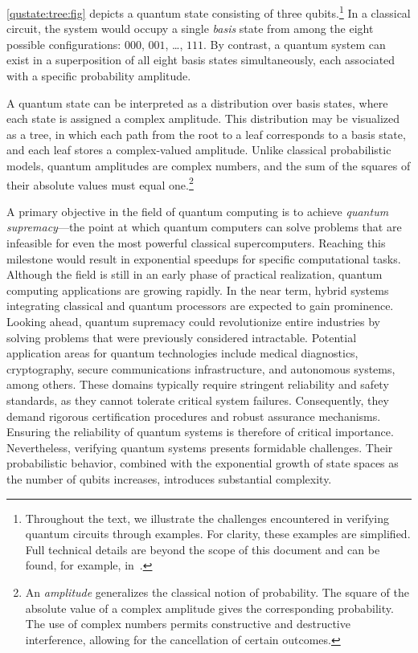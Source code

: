 \cref{qustate:tree:fig} depicts a quantum state consisting of three qubits.\footnote{Throughout the text, we illustrate the challenges encountered in verifying quantum circuits through examples. %
For clarity, these examples are simplified. Full technical details are beyond the scope of this document and can be found, for example, in~\citep{10.5555/1408782}.} In a classical circuit, the system would occupy a single \emph{basis} state from among the eight possible configurations: $000$, $001$, \ldots, $111$. %
By contrast, a quantum system can exist in a superposition of all eight basis states simultaneously, each associated with a specific probability amplitude.

A quantum state can be interpreted as a distribution over basis states, where each state is assigned a complex amplitude. This distribution may be visualized as a tree, in which each path from the root to a leaf corresponds to a basis state, and each leaf stores a complex-valued amplitude. 
%
Unlike classical probabilistic models, quantum amplitudes are complex numbers, and the sum of the squares of their absolute values must equal one.\footnote{An \emph{amplitude} generalizes the classical notion of probability. The square of the absolute value of a complex amplitude gives the corresponding probability. The use of complex numbers permits constructive and destructive interference, allowing for the cancellation of certain outcomes.} 
%

A primary objective in the field of quantum computing is to achieve \emph{quantum supremacy}---the point at which quantum computers can solve problems that are infeasible for even the most powerful classical supercomputers. 
%
Reaching this milestone would result in exponential speedups for specific computational tasks. 
%
%
Although the field is still in an early phase of practical realization, quantum computing applications are growing rapidly. %
In the near term, hybrid systems integrating classical and quantum processors are expected to gain prominence. Looking ahead, quantum supremacy could revolutionize entire industries by solving problems that were previously considered intractable. 
%
Potential application areas for quantum technologies include medical diagnostics, cryptography, secure communications infrastructure, and autonomous systems, among others. 
%
These domains typically require stringent reliability and safety standards, as they cannot tolerate critical system failures. Consequently, they demand rigorous certification procedures and robust assurance mechanisms. Ensuring the reliability of quantum systems is therefore of critical importance. %
%
Nevertheless, verifying quantum systems presents formidable challenges. Their probabilistic behavior, combined with the exponential growth of state spaces as the number of qubits increases, introduces substantial complexity. %

